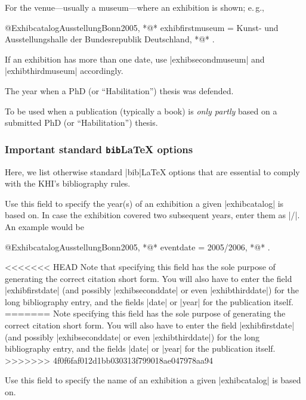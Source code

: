 \documentclass[a4paper,
10pt,
ngerman,
english
]{ltxdoc}
\begin{document}
For the venue---usually a museum---where an exhibition is shown; e.\,g.,
\begin{code}
@Exhibcatalog{AusstellungBonn2005,
  *@\ldots@*
  exhibfirstmuseum = {Kunst- und Ausstellungshalle der Bundesrepublik Deutschland},
  *@\ldots@*
}.
\end{code}
If an exhibition has more than one date, use |exhibsecondmuseum| and |exhibthirdmuseum| accordingly.

The year when a PhD (or \enquote{Habilitation}) thesis was defended.

To be used when a publication (typically a book) is \emph{only partly} based on a submitted PhD (or \enquote{Habilitation}) thesis.


\subsubsection{Important standard \texttt{bib}\LaTeX{} options}\label{sec:bibl-efields}
Here, we list otherwise standard |bib|\LaTeX{} options that are essential to comply with the KHI's bibliography rules.

Use this field to specify the year(s) of an exhibition a given |exhibcatalog| is based on. In case the exhibition covered two subsequent years, enter them as |/|. An example would be
\begin{code}
@Exhibcatalog{AusstellungBonn2005,
  *@\ldots@*
  eventdate = {2005/2006},
  *@\ldots@*
}.
\end{code}
<<<<<<< HEAD
Note that specifying this field has the sole purpose of generating the correct citation short form.
You will also have to enter the field |exhibfirstdate| (and possibly |exhibseconddate| or even |exhibthirddate|) for the long bibliography entry, and the fields |date| or |year| for the publication itself. 
=======
Note specifying this field has the sole purpose of generating the correct citation short form.
You will also have to enter the field |exhibfirstdate| (and possibly |exhibseconddate| or even |exhibthirddate|) for the long bibliography entry, 
and the fields |date| or |year| for the publication itself. 
>>>>>>> 4f0f6faf012d1bb030313f799018ae047978aa94

Use this field to specify the name of an exhibition a given |exhibcatalog| is based on.
\end{document}

